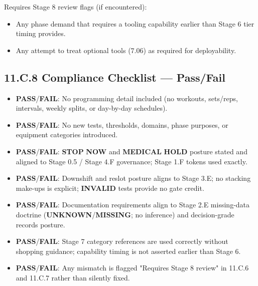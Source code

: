 \documentclass[10pt]{article}
\begin{document}
\endgroup

Requires Stage 8 review flags (if encountered):

\begin{itemize}
\item Any phase demand that requires a tooling capability earlier than Stage 6 tier timing provides.
\item Any attempt to treat optional tools (7.06) as required for deployability.
\end{itemize}

\newpage

\subsection*{11.C.8 Compliance Checklist — Pass/Fail}
{}

\begin{itemize}
\item \textbf{PASS}/\textbf{FAIL}: No programming detail included (no workouts, sets/reps, intervals, weekly splits, or day-by-day schedules).
\item \textbf{PASS}/\textbf{FAIL}: No new tests, thresholds, domains, phase purposes, or equipment categories introduced.
\item \textbf{PASS}/\textbf{FAIL}: \textbf{STOP} \textbf{NOW} and \textbf{MEDICAL} \textbf{HOLD} posture stated and aligned to Stage 0.5 / Stage 4.F governance; Stage 1.F tokens used exactly.
\item \textbf{PASS}/\textbf{FAIL}: Downshift and reslot posture aligns to Stage 3.E; no stacking make-ups is explicit; \textbf{INVALID} tests provide no gate credit.
\item \textbf{PASS}/\textbf{FAIL}: Documentation requirements align to Stage 2.E missing-data doctrine (\textbf{UNKNOWN}/\textbf{MISSING}; no inference) and decision-grade records posture.
\item \textbf{PASS}/\textbf{FAIL}: Stage 7 category references are used correctly without shopping guidance; capability timing is not asserted earlier than Stage 6.
\item \textbf{PASS}/\textbf{FAIL}: Any mismatch is flagged "Requires Stage 8 review" in 11.C.6 and 11.C.7 rather than silently fixed.
\end{itemize}
\end{document}
